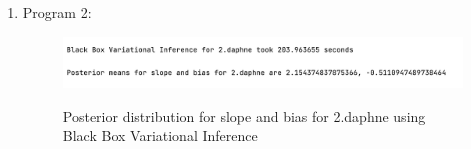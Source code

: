 \documentclass{article}
\begin{document}
\begin{enumerate}
\newpage
\item Program 2:

\begin{figure}[!ht]
	\centering
	\includegraphics[scale=0.5]{../figs/2_daphne_results}
\end{figure}


\begin{figure}[!htp] 
    \centering
    \hfill%
        \caption{Posterior distribution for slope and bias for 2.daphne using Black Box Variational Inference}
\end{figure}


\end{enumerate}
\end{document}
